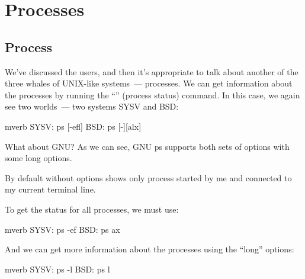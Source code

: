 \section*{Processes}

\subsection*{Process}

We've discussed the users, and then it's appropriate to talk about
another of the three whales of UNIX-like systems~--- processes. We can get
information about the processes by running the ``'' (process status)
command. In this case, we again see two worlds~--- two systems SYSV and BSD:
\begin{code}{mverb}
SYSV:  ps [-efl]
BSD:   ps [-][alx]
\end{code}

What about GNU? As we can see, GNU ps supports both sets of options with
some long options.

By default  without options shows only process started by me and
connected to my current terminal line.

To get the status for all processes, we must use:
\begin{code}{mverb}
SYSV:  ps -ef
BSD:   ps ax
\end{code}

And we can get more information about the processes using the ``long'' options:
\begin{code}{mverb}
SYSV:  ps -l
BSD:   ps l
\end{code}

